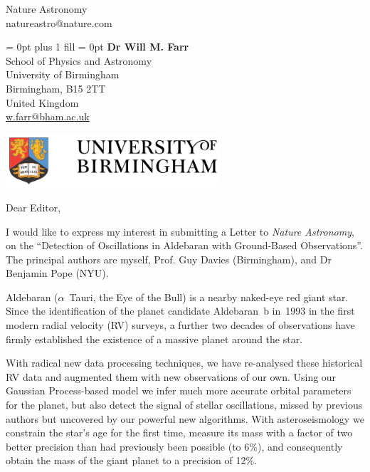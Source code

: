\documentclass[11pt]{letter} %
\begin{document}
%
\longindentation=0pt                       %
\let\raggedleft\raggedright                %

\nopagebreak  
\begin{letter}
{Nature Astronomy \\
natureastro@nature.com \\}
      
{
\leftskip = 0pt plus 1 fill
\rightskip = 0pt
\parindent 0pt
%
%
{{\bf Dr Will M. Farr}} \\
School of Physics and Astronomy\\
University of Birmingham\\
Birmingham, B15 2TT\\
United Kingdom\\
 \url{w.farr@bham.ac.uk} \\
 
}


\begin{minipage}[c]{5in}\vskip-4.25cm
\begin{flushleft}
	\begin{minipage}[c]{3cm}
		\begin{flushleft}
			\includegraphics*[width=8cm]{birmingham_logo.png}%
		\end{flushleft}
	\end{minipage}
\end{flushleft}
\end{minipage}

\opening{Dear Editor,} 
 
\noindent I would like to express my interest in submitting a Letter to \emph{Nature Astronomy}, on the ``Detection of Oscillations in Aldebaran with Ground-Based Observations''. The principal authors are myself, Prof. Guy Davies (Birmingham), and Dr Benjamin Pope (NYU).

Aldebaran ($\alpha$~Tauri, the Eye of the Bull) is a nearby naked-eye red giant star. Since the identification of the planet candidate Aldebaran~b in~1993 in the first modern radial velocity (RV) surveys, a further two decades of observations have firmly established the existence of a massive planet around the star. 

With radical new data processing techniques, we have re-analysed these historical RV data and augmented them with new observations of our own. Using our Gaussian Process-based model we infer much more accurate orbital parameters for the planet, but also detect the signal of stellar oscillations, missed by previous authors but uncovered by our powerful new algorithms. With asteroseismology we constrain the star's age for the first time, measure its mass with a factor of two better precision than had previously been possible (to 6\%), and consequently obtain the mass of the giant planet to a precision of 12\%.


\end{letter}
\end{document}
